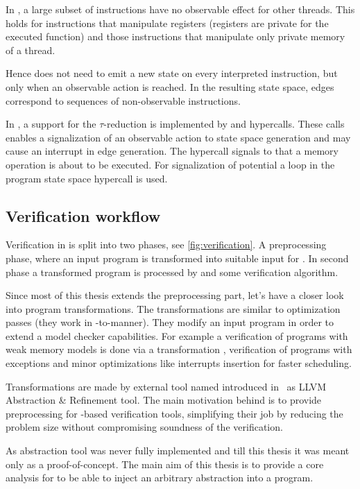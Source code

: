 In \LLVM, a large subset of instructions have no observable effect for other
threads. This holds for instructions that manipulate registers (registers
are private for the executed function) and those instructions that manipulate
only private memory of a thread.

Hence \DIVINE does not need to emit a new state on every interpreted
instruction, but only when an observable action is reached. In the resulting state
space, edges correspond to sequences of non-observable instructions.

In \DIVM, a support for the $\tau$-reduction is implemented by 
and  hypercalls. These calls enables a signalization of an
observable action to state space generation and may cause an interrupt in edge
generation. The  hypercall signals to \DIVM that a memory
operation is about to be executed. For signalization of potential a loop in the
program state space  hypercall is used.
\subsection{Verification workflow}

Verification in \DIVINE is split into two phases, see \autoref{fig:verification}.
A preprocessing phase, where an input program is
transformed into suitable input for \DIVM. In second phase a transformed program
is processed by \DIVM and some verification algorithm.

Since most of this thesis extends the preprocessing part, let's have a closer
look into program transformations. The transformations are similar to \LLVM
optimization passes (they work in \LLVM -to-\LLVM manner). They modify an input
program in order to extend a model checker capabilities. For example a
verification of programs with weak memory models is done via a transformation
\cite{Still16}, verification of programs with exceptions \cite{Still17} and minor
optimizations like interrupts insertion for faster scheduling.

Transformations are made by external tool named \LART introduced in~\cite{Rockai15}
as LLVM Abstraction \& Refinement tool. The main motivation behind \LART is to
provide preprocessing for \LLVM -based verification tools, simplifying their
job by reducing the problem size without compromising soundness of the
verification.

As abstraction tool \LART was never fully implemented and till this thesis it
was meant only as a proof-of-concept. The main aim of this thesis is to provide
a core analysis for \LART to be able to inject an arbitrary abstraction into a
program.

